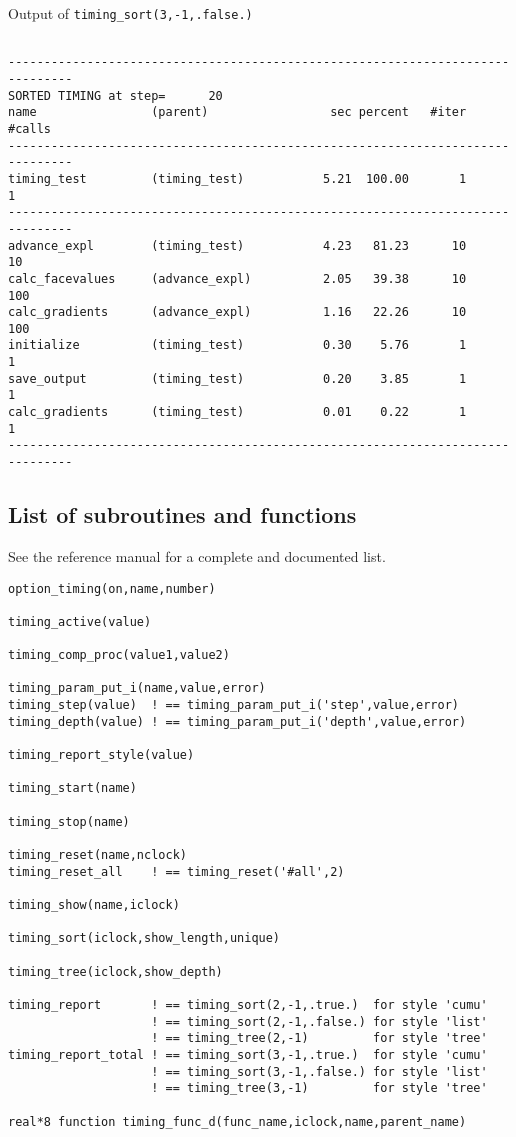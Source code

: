 \begin{table}
\caption{Output of {\tt timing\_sort(3,-1,.false.)}}
{\footnotesize
\begin{verbatim}

-------------------------------------------------------------------------------
SORTED TIMING at step=      20
name                (parent)                 sec percent   #iter  #calls
-------------------------------------------------------------------------------
timing_test         (timing_test)           5.21  100.00       1       1
-------------------------------------------------------------------------------
advance_expl        (timing_test)           4.23   81.23      10      10
calc_facevalues     (advance_expl)          2.05   39.38      10     100
calc_gradients      (advance_expl)          1.16   22.26      10     100
initialize          (timing_test)           0.30    5.76       1       1
save_output         (timing_test)           0.20    3.85       1       1
calc_gradients      (timing_test)           0.01    0.22       1       1
-------------------------------------------------------------------------------

\end{verbatim}
}
\label{t-timinglist3}
\end{table}

\newpage
\subsection{List of subroutines and functions}

See the reference manual for a complete and documented list.
\begin{verbatim}
option_timing(on,name,number)

timing_active(value)

timing_comp_proc(value1,value2)

timing_param_put_i(name,value,error)
timing_step(value)  ! == timing_param_put_i('step',value,error)
timing_depth(value) ! == timing_param_put_i('depth',value,error)

timing_report_style(value)

timing_start(name)

timing_stop(name)

timing_reset(name,nclock)
timing_reset_all    ! == timing_reset('#all',2)

timing_show(name,iclock)

timing_sort(iclock,show_length,unique)

timing_tree(iclock,show_depth)

timing_report       ! == timing_sort(2,-1,.true.)  for style 'cumu'
                    ! == timing_sort(2,-1,.false.) for style 'list'
                    ! == timing_tree(2,-1)         for style 'tree'
timing_report_total ! == timing_sort(3,-1,.true.)  for style 'cumu'
                    ! == timing_sort(3,-1,.false.) for style 'list'
                    ! == timing_tree(3,-1)         for style 'tree'

real*8 function timing_func_d(func_name,iclock,name,parent_name)
\end{verbatim}

